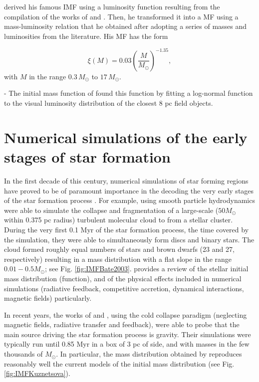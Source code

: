 \citet{Salpeter1955} derived his famous IMF using a luminosity function resulting from the compilation of the works of \citet{1939POMin...7....1L,1941NYASA..42..201L} and \citet{1925PGro...38D...1V,1936PGro...47....1V}. Then, he transformed it into a MF using a mass-luminosity relation that he obtained after adopting a series of masses and luminosities from the literature. His MF has the form

\begin{equation}
\xi(M)=0.03 \left(\frac{M}{M_{\odot}}\right)^{-1.35},
\end{equation}
with $M$ in the range $0.3\,M_{\odot}$ to  $17\,M_{\odot}$.
 
- The initial mass function of \citet{Chabrier2003,Chabrier2005,Thies2007}
\citet{Chabrier2005} found this function by fitting a log-normal function to the visual luminosity distribution of the closest $8$ pc field objects.

\section{Numerical simulations of the early stages of star formation}
\label{sect:numerical_simulations}

In the first decade of this century, numerical simulations of star forming regions have proved to be of paramount importance in the decoding the very early stages of the star formation process \citep{2003MNRAS.339..577B,2005A&A...435..611J,2009MNRAS.392..590B,2009MNRAS.392.1363B,2009MNRAS.397..232B}. For example, \citet{2003MNRAS.339..577B} using smooth particle hydrodynamics were able to simulate the collapse and fragmentation of a large-scale ($50 M_{\odot}$ within 0.375 pc radius) turbulent molecular cloud to from a stellar cluster. During the very first 0.1 Myr of the star formation process, the time covered by the simulation, they were able to simultaneously form discs and binary stars. The cloud formed roughly equal numbers of stars and brown dwarfs (23 and 27, respectively) resulting in a mass distribution with a flat slope in the range $0.01-0.5 M_{\odot}$; see Fig. \ref{fig:IMFBate2003}. \citet{Offner2014} provides a review of the stellar initial mass distribution (function), and of the physical effects included in numerical simulations (radiative feedback, competitive accretion, dynamical interactions, magnetic fields) particularly. 

In recent years, the works of \citet{2015ApJ...815...27K} and \citet{2015MNRAS.452..566B}, using the cold collapse paradigm (neglecting magnetic fields, radiative transfer and feedback), were able to probe that the main source driving the star formation process is gravity. Their simulations were typically run until 0.85 Myr in a box of 3 pc of side, and with masses in the few thousands of $M_{\odot}$. In particular, the mass distribution obtained by \citet{2015ApJ...815...27K} reproduces reasonably well the current models of the initial mass distribution (see Fig. \ref{fig:IMFKuznetsova}).

